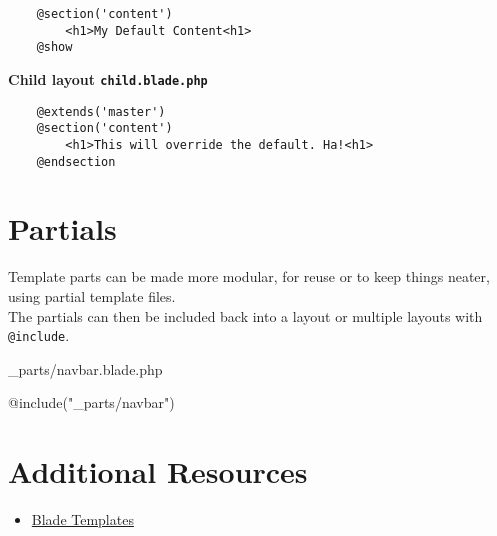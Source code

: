 \begin{verbatim}
    @section('content')
        <h1>My Default Content<h1>
    @show
\end{verbatim}

\textbf{Child layout \texttt{child.blade.php}}
\begin{verbatim}
    @extends('master')
    @section('content')
        <h1>This will override the default. Ha!<h1>
    @endsection
\end{verbatim}

\section{Partials}

Template parts can be made more modular, for reuse or to keep things neater, using partial template files.
\\

The partials can then be included back into a layout or multiple layouts with \texttt{@include}.

_parts/navbar.blade.php

@include("_parts/navbar")



\section{Additional Resources}

\begin{itemize}[leftmargin=*]
    \item \href{http://laravel.com/docs/master/blade}{Blade Templates}
\end{itemize}
